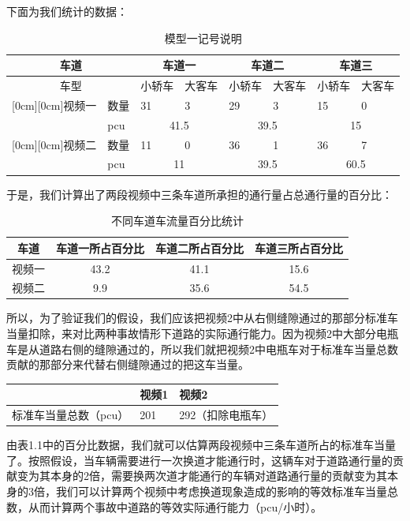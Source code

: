 \documentclass{cumcmart}
\begin{document}
下面为我们统计的数据：
\begin{table}[h]
\centering
\begin{tabular}{|l|l|l|l|l|l|l|l|}
\hline
\multicolumn{2}{|c|}{车道} & \multicolumn{2}{|c|}{车道一} & \multicolumn{2}{|c|}{车道二} & \multicolumn{2}{|c|}{车道三} \\
\hline
\multicolumn{2}{|c|}{车型} & 小轿车& 大客车& 小轿车& 大客车& 小轿车& 大客车 \\
\hline
\raisebox{-1.50ex}[0cm][0cm]{视频一}& 数量& 31& 3& 29& 3& 15& 0 \\
\cline{2-8}
 & pcu& \multicolumn{2}{|c|}{41.5} & \multicolumn{2}{|c|}{39.5} & \multicolumn{2}{|c|}{15} \\
\raisebox{-1.50ex}[0cm][0cm]{视频二}& 数量& 11& 0& 36& 1& 36& 7 \\
\cline{2-8}
 & pcu& \multicolumn{2}{|c|}{11} & \multicolumn{2}{|c|}{39.5} & \multicolumn{2}{|c|}{60.5} \\
\hline
\end{tabular}
\caption{模型一记号说明}
\label{tab8}
\end{table}

于是，我们计算出了两段视频中三条车道所承担的通行量占总通行量的百分比：
\begin{table}[htbp]
\centering
\begin{tabular}{|c|c|c|c|}
\hline
车道& 车道一所占百分比& 车道二所占百分比& 车道三所占百分比 \\
\hline
视频一& 43.2& 41.1& 15.6 \\
\hline
视频二& 9.9& 35.6& 54.5 \\
\hline
\end{tabular}
\caption{不同车道车流量百分比统计}
\end{table}

所以，为了验证我们的假设，我们应该把视频2中从右侧缝隙通过的那部分标准车当量扣除，来对比两种事故情形下道路的实际通行能力。因为视频2中大部分电瓶车是从道路右侧的缝隙通过的，所以我们就把视频2中电瓶车对于标准车当量总数贡献的那部分来代替右侧缝隙通过的把这车当量。
\begin{table}[htbp]
\centering
\begin{tabular}{|p{135pt}|l|l|}
\hline
&视频1&视频2 \\
\hline
标准车当量总数（pcu）&201&292（扣除电瓶车） \\
\hline
\end{tabular}
\label{tab10}
\end{table}

由表1.1中的百分比数据，我们就可以估算两段视频中三条车道所占的标准车当量了。按照假设，当车辆需要进行一次换道才能通行时，这辆车对于道路通行量的贡献变为其本身的2倍，需要换两次道才能通行的车辆对道路通行量的贡献变为其本身的3倍，我们可以计算两个视频中考虑换道现象造成的影响的等效标准车当量总数，从而计算两个事故中道路的等效实际通行能力（pcu/小时）。
\end{document}
